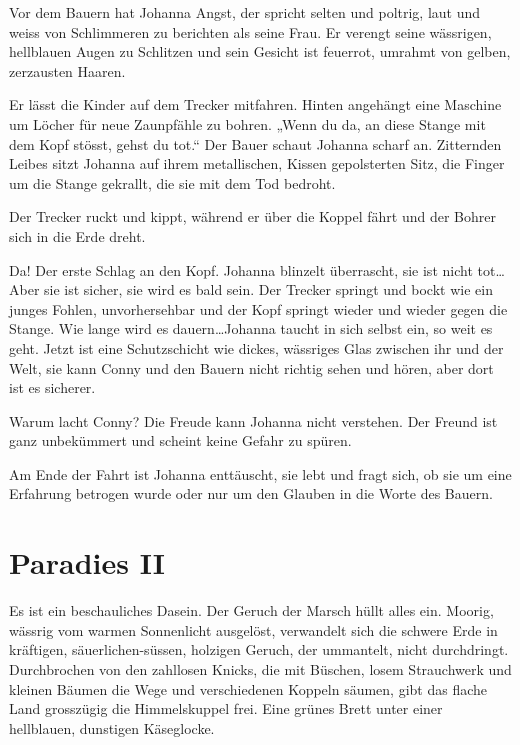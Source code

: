 \documentclass[10pt,a5paper]{book}
\begin{document}
Vor dem Bauern hat Johanna Angst, der spricht selten und poltrig, laut und weiss von Schlimmeren zu berichten als seine Frau. Er verengt seine wässrigen, hellblauen Augen zu Schlitzen und sein Gesicht ist feuerrot, umrahmt von gelben, zerzausten Haaren.

Er lässt die Kinder auf dem Trecker mitfahren. Hinten angehängt eine Maschine um Löcher für neue Zaunpfähle zu bohren. „Wenn du da, an diese Stange mit dem Kopf stösst, gehst du tot.“ Der Bauer schaut Johanna scharf an. Zitternden Leibes sitzt Johanna auf ihrem metallischen, Kissen gepolsterten Sitz, die Finger um die Stange gekrallt, die sie mit dem Tod bedroht.

Der Trecker ruckt und kippt, während er über die Koppel fährt und der Bohrer sich in die Erde dreht.

Da! Der erste Schlag an den Kopf. Johanna blinzelt überrascht, sie ist nicht tot\dots Aber sie ist sicher, sie wird es bald sein. Der Trecker springt und bockt wie ein junges Fohlen, unvorhersehbar und der Kopf springt wieder und wieder gegen die Stange. Wie lange wird es dauern\dots Johanna taucht in sich selbst ein, so weit es geht. Jetzt ist eine Schutzschicht wie dickes, wässriges Glas zwischen ihr und der Welt, sie kann Conny und den Bauern nicht richtig sehen und hören, aber dort ist es sicherer.

Warum lacht Conny? Die Freude kann Johanna nicht verstehen. Der Freund ist ganz unbekümmert und scheint keine Gefahr zu spüren.

Am Ende der Fahrt ist Johanna enttäuscht, sie lebt und fragt sich, ob sie um eine Erfahrung betrogen wurde oder nur um den Glauben in die Worte des Bauern.



\section*{Paradies II}



Es ist ein beschauliches Dasein. Der Geruch der Marsch hüllt alles ein. Moorig, wässrig vom warmen Sonnenlicht ausgelöst, verwandelt sich die schwere Erde in kräftigen, säuerlichen-süssen, holzigen Geruch, der ummantelt, nicht durchdringt. Durchbrochen von den zahllosen Knicks, die mit Büschen, losem Strauchwerk und kleinen Bäumen die Wege und verschiedenen Koppeln säumen, gibt das flache Land grosszügig die Himmelskuppel frei. Eine grünes Brett unter einer hellblauen, dunstigen Käseglocke. 
\end{document}

